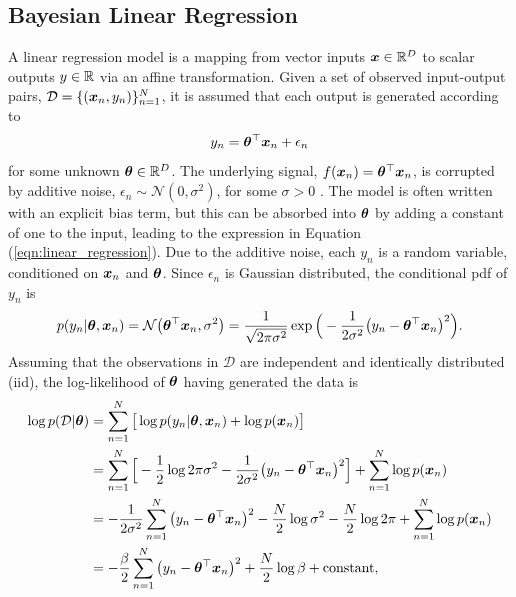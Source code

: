 \documentclass[10pt]{article} %
\begin{document}
\subsection{Bayesian Linear Regression}
\label{sec:bayesian_lr}
A linear regression model is a mapping from vector inputs ${\bm{x}} \in \mathbb{R}^D$ to scalar outputs $y \in \mathbb{R}$ via an affine transformation. Given a set of observed input-output pairs, $\mathcal{D} = \{({\bm{x}}_n, y_n)\}_{n=1}^{N}$, it is assumed that each output is generated according to 
\begin{equation}
\label{eqn:linear_regression}
    y_n = {\bm{\theta}}^\top {\bm{x}}_n + \epsilon_n
\end{equation}
for some unknown ${\bm{\theta}} \in \mathbb{R}^D$. The underlying signal, $f({\bm{x}}_n) = {\bm{\theta}}^\top {\bm{x}}_n$, is corrupted by additive noise, $\epsilon_n \sim \mathcal{N}(0, \sigma^2)$, for some $\sigma > 0$ \citep{barber2007}. The model is often written with an explicit bias term, but this can be absorbed into ${\bm{\theta}}$ by adding a constant of one to the input, leading to the expression in Equation (\ref{eqn:linear_regression}). Due to the additive noise, each $y_n$ is a random variable, conditioned on ${\bm{x}}_n$ and ${\bm{\theta}}$. Since $\epsilon_n$ is Gaussian distributed, the conditional pdf of $y_n$ is 
\begin{equation}
\label{eqn:linear_regression_pdf}
    p(y_n | {\bm{\theta}}, {\bm{x}}_n) = \mathcal{N}\big({\bm{\theta}}^\top {\bm{x}}_n, \sigma^2\big) = \frac{1}{\sqrt{2\pi \sigma^2}} \exp\Big(-\frac{1}{2\sigma^2} \big(y_n - {\bm{\theta}}^\top {\bm{x}}_n \big)^2\Big).
\end{equation}
Assuming that the observations in $\mathcal{D}$ are independent and identically distributed (iid), the log-likelihood of ${\bm{\theta}}$ having generated the data is 
\begin{align}
\label{eqn:linear_regression_log_likelihood}
\begin{split}
	\log p(\mathcal{D} | {\bm{\theta}}) 
	& = \sum_{n=1}^N \big[ \log p(y_n | {\bm{\theta}}, {\bm{x}}_n)  + \log p({\bm{x}}_n) \big] \\
	& = \sum_{n=1}^N \Big[ -\frac{1}{2} \log 2\pi \sigma^2 - \frac{1}{2\sigma^2} \big(y_n - {\bm{\theta}}^\top {\bm{x}}_n \big)^2 \Big]
	+ \sum_{n=1}^N \log p({\bm{x}}_n) \\
	& = - \frac{1}{2 \sigma^2} \sum_{n=1}^N \big(y_n - {\bm{\theta}}^\top {\bm{x}}_n \big)^2 
	- \frac{N}{2} \log \sigma^2
	- \frac{N}{2} \log 2\pi
	+ \sum_{n=1}^N \log p({\bm{x}}_n) \\
	& = - \frac{\beta}{2} \sum_{n=1}^N \big(y_n - {\bm{\theta}}^\top {\bm{x}}_n \big)^2 
	+ \frac{N}{2} \log \beta
	+ \text{constant},
\end{split}
\end{align}
\end{document}
